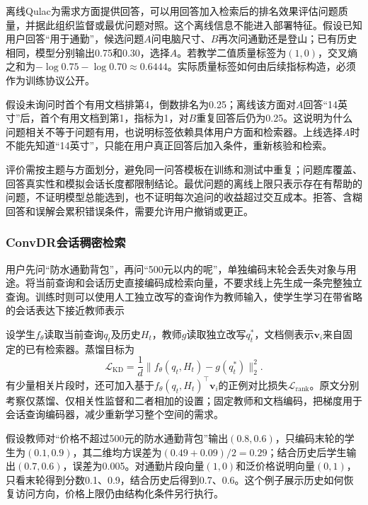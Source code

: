 离线Qulac为需求方面提供回答，可以用回答加入检索后的排名效果评估问题质量，并据此组织监督或最优问题对照。这个离线信息不能进入部署特征。假设已知用户回答“用于通勤”，候选问题$A$问电脑尺寸、$B$再次问通勤还是登山；已有历史相同，模型分别输出0.75和0.30，选择$A$。若教学二值质量标签为$(1,0)$，交叉熵之和为$-\log0.75-\log0.70\approx0.6444$。实际质量标签如何由后续指标构造，必须作为训练协议公开。

假设未询问时首个有用文档排第4，倒数排名为0.25；离线该方面对$A$回答“14英寸”后，首个有用文档到第1，指标为1，对$B$重复回答后仍为0.25。这说明为什么问题相关不等于问题有用，也说明标签依赖具体用户方面和检索器。上线选择$A$时不能先知道“14英寸”，只能在用户真正回答后加入条件，重新核验和检索。

评价需按主题与方面划分，避免同一问答模板在训练和测试中重复；问题库覆盖、回答真实性和模拟会话长度都限制结论。最优问题的离线上限只表示存在有帮助的问题，不证明模型总能选到，也不证明每次追问的收益超过交互成本。拒答、含糊回答和误解会累积错误条件，需要允许用户撤销或更正。

\Needspace{100mm}
\subsubsection{ConvDR会话稠密检索}
\label{sec:rs-search-convdr}

用户先问“防水通勤背包”，再问“500元以内的呢”，单独编码末轮会丢失对象与用途。将当前查询和会话历史直接编码成检索向量，不要求线上先生成一条完整独立查询。训练时则可以使用人工独立改写的查询作为教师输入，使学生学习在带省略的会话表达下接近教师表示

设学生$f_\theta$读取当前查询$q_t$及历史$H_t$，教师$g$读取独立改写$q_t^*$，文档侧表示$\bm v_i$来自固定的已有检索器。蒸馏目标为
\begin{equation}
 \mathcal L_{\mathrm{KD}}
 =\frac1d\|f_\theta(q_t,H_t)-g(q_t^*)\|_2^2 .
 \label{eq:rs-search-convdr}
\end{equation}
有少量相关片段时，还可加入基于$f_\theta(q_t,H_t)^\top\bm v_i$的正例对比损失$\mathcal L_{\mathrm{rank}}$。原文分别考察仅蒸馏、仅相关性监督和二者相加的设置；固定教师和文档编码，把梯度用于会话查询编码器，减少重新学习整个空间的需求。

假设教师对“价格不超过500元的防水通勤背包”输出$(0.8,0.6)$，只编码末轮的学生为$(0.1,0.9)$，其二维均方误差为$(0.49+0.09)/2=0.29$；结合历史后学生输出$(0.7,0.6)$，误差为0.005。对通勤片段向量$(1,0)$和泛价格说明向量$(0,1)$，只看末轮得到分数0.1、0.9，结合历史后得到0.7、0.6。这个例子展示历史如何恢复访问方向，价格上限仍由结构化条件另行执行。

